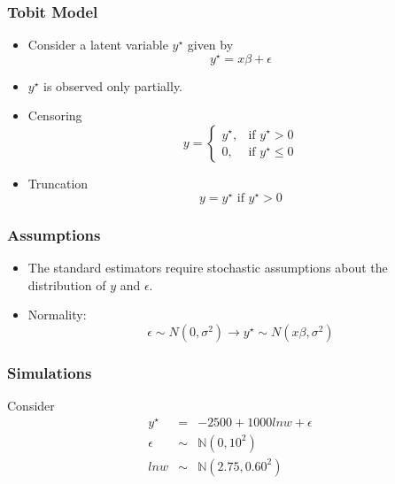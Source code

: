 \documentclass{beamer}
\newcommand{\1}{\mathbb{1}}
\newcommand{\N}{\mathbb{N}}
\begin{document}
\begin{frame}\frametitle{Tobit Model}
\begin{itemize}
 \item Consider a latent variable $y^{\star}$ given by
 \begin{equation}
  y^{\star} = x\beta + \epsilon
 \end{equation}
\item $y^{\star}$ is observed only partially.
\item Censoring 
\begin{equation}
y = \begin{cases} y^{\star}, & \mbox{if } y^{\star} > 0 \\ 0, & \mbox{if } y^{\star} \leq 0 \end{cases}
\end{equation}
\item Truncation
\begin{equation}
 y= y^{\star} \mbox{ if } y^{\star}>0
\end{equation}
\end{itemize}
\end{frame}

\begin{frame}\frametitle{Assumptions}
\begin{itemize}
 \item The standard estimators require stochastic assumptions about the distribution of $y$ and $\epsilon$. 
 \item Normality:
 \begin{equation}
  \epsilon \sim N(0,\sigma^2) \rightarrow y^{\star} \sim N(x\beta,\sigma^2)
 \end{equation}
\end{itemize}
\end{frame}

\begin{frame}\frametitle{Simulations}
Consider 
\begin{eqnarray}
y^{\star} &=& -2500 + 1000 lnw + \epsilon\\
\epsilon &\sim& \N(0,10^2)\\
lnw &\sim& \N(2.75,0.60^2)
\end{eqnarray}
\end{frame}
\end{document}
